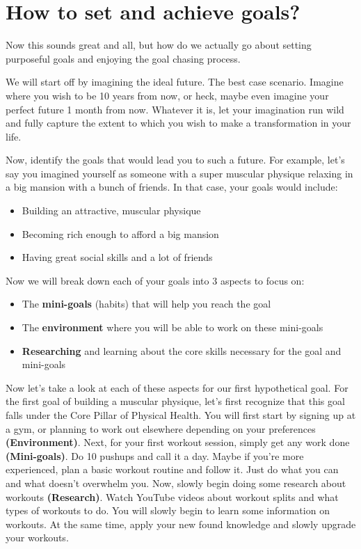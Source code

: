 \documentclass[
]{book}
\providecommand{\tightlist}{%
  \setlength{\itemsep}{0pt}\setlength{\parskip}{0pt}}
\begin{document}
\hypertarget{how-to-set-and-achieve-goals}{%
\section{How to set and achieve goals?}\label{how-to-set-and-achieve-goals}}

Now this sounds great and all, but how do we actually go about setting purposeful goals and enjoying the goal chasing process.

We will start off by imagining the ideal future. The best case scenario. Imagine where you wish to be 10 years from now, or heck, maybe even imagine your perfect future 1 month from now. Whatever it is, let your imagination run wild and fully capture the extent to which you wish to make a transformation in your life.

Now, identify the goals that would lead you to such a future. For example, let's say you imagined yourself as someone with a super muscular physique relaxing in a big mansion with a bunch of friends. In that case, your goals would include:

\begin{itemize}
\tightlist
\item
  Building an attractive, muscular physique
\item
  Becoming rich enough to afford a big mansion
\item
  Having great social skills and a lot of friends
\end{itemize}

Now we will break down each of your goals into 3 aspects to focus on:

\begin{itemize}
\tightlist
\item
  The \textbf{mini-goals} (habits) that will help you reach the goal
\item
  The \textbf{environment} where you will be able to work on these mini-goals
\item
  \textbf{Researching} and learning about the core skills necessary for the goal and mini-goals
\end{itemize}

Now let's take a look at each of these aspects for our first hypothetical goal. For the first goal of building a muscular physique, let's first recognize that this goal falls under the Core Pillar of Physical Health. You will first start by signing up at a gym, or planning to work out elsewhere depending on your preferences \textbf{(Environment)}. Next, for your first workout session, simply get any work done \textbf{(Mini-goals)}. Do 10 pushups and call it a day. Maybe if you're more experienced, plan a basic workout routine and follow it. Just do what you can and what doesn't overwhelm you. Now, slowly begin doing some research about workouts \textbf{(Research)}. Watch YouTube videos about workout splits and what types of workouts to do. You will slowly begin to learn some information on workouts. At the same time, apply your new found knowledge and slowly upgrade your workouts.
\end{document}
